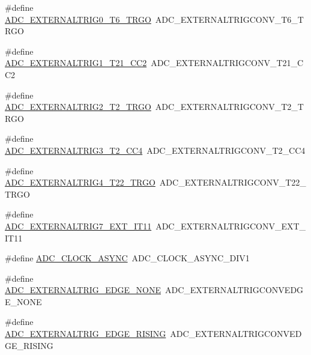 \begin{DoxyCompactItemize}
\item 
\#define \hyperlink{group___h_a_l___a_d_c___aliased___defines_ga72d7fcd1d65274786de2b3ccd6b853c4}{A\+D\+C\+\_\+\+E\+X\+T\+E\+R\+N\+A\+L\+T\+R\+I\+G0\+\_\+\+T6\+\_\+\+T\+R\+GO}~A\+D\+C\+\_\+\+E\+X\+T\+E\+R\+N\+A\+L\+T\+R\+I\+G\+C\+O\+N\+V\+\_\+\+T6\+\_\+\+T\+R\+GO
\item 
\#define \hyperlink{group___h_a_l___a_d_c___aliased___defines_gab001be8f7abe45ddf92a476a65c6dd50}{A\+D\+C\+\_\+\+E\+X\+T\+E\+R\+N\+A\+L\+T\+R\+I\+G1\+\_\+\+T21\+\_\+\+C\+C2}~A\+D\+C\+\_\+\+E\+X\+T\+E\+R\+N\+A\+L\+T\+R\+I\+G\+C\+O\+N\+V\+\_\+\+T21\+\_\+\+C\+C2
\item 
\#define \hyperlink{group___h_a_l___a_d_c___aliased___defines_gaad24eb6d74f2e4396d59afc4c715a053}{A\+D\+C\+\_\+\+E\+X\+T\+E\+R\+N\+A\+L\+T\+R\+I\+G2\+\_\+\+T2\+\_\+\+T\+R\+GO}~A\+D\+C\+\_\+\+E\+X\+T\+E\+R\+N\+A\+L\+T\+R\+I\+G\+C\+O\+N\+V\+\_\+\+T2\+\_\+\+T\+R\+GO
\item 
\#define \hyperlink{group___h_a_l___a_d_c___aliased___defines_gaa0f8054b3363d13a190ee0d366363575}{A\+D\+C\+\_\+\+E\+X\+T\+E\+R\+N\+A\+L\+T\+R\+I\+G3\+\_\+\+T2\+\_\+\+C\+C4}~A\+D\+C\+\_\+\+E\+X\+T\+E\+R\+N\+A\+L\+T\+R\+I\+G\+C\+O\+N\+V\+\_\+\+T2\+\_\+\+C\+C4
\item 
\#define \hyperlink{group___h_a_l___a_d_c___aliased___defines_ga671cb20b99d24f3c9923ac7777e5f84e}{A\+D\+C\+\_\+\+E\+X\+T\+E\+R\+N\+A\+L\+T\+R\+I\+G4\+\_\+\+T22\+\_\+\+T\+R\+GO}~A\+D\+C\+\_\+\+E\+X\+T\+E\+R\+N\+A\+L\+T\+R\+I\+G\+C\+O\+N\+V\+\_\+\+T22\+\_\+\+T\+R\+GO
\item 
\#define \hyperlink{group___h_a_l___a_d_c___aliased___defines_ga54407c5dc446f7d5425d8ac135bee69e}{A\+D\+C\+\_\+\+E\+X\+T\+E\+R\+N\+A\+L\+T\+R\+I\+G7\+\_\+\+E\+X\+T\+\_\+\+I\+T11}~A\+D\+C\+\_\+\+E\+X\+T\+E\+R\+N\+A\+L\+T\+R\+I\+G\+C\+O\+N\+V\+\_\+\+E\+X\+T\+\_\+\+I\+T11
\item 
\#define \hyperlink{group___h_a_l___a_d_c___aliased___defines_gae507056750621dbc26572874e89ef791}{A\+D\+C\+\_\+\+C\+L\+O\+C\+K\+\_\+\+A\+S\+Y\+NC}~A\+D\+C\+\_\+\+C\+L\+O\+C\+K\+\_\+\+A\+S\+Y\+N\+C\+\_\+\+D\+I\+V1
\item 
\#define \hyperlink{group___h_a_l___a_d_c___aliased___defines_ga324129b8c65e1f89b0002c31297935eb}{A\+D\+C\+\_\+\+E\+X\+T\+E\+R\+N\+A\+L\+T\+R\+I\+G\+\_\+\+E\+D\+G\+E\+\_\+\+N\+O\+NE}~A\+D\+C\+\_\+\+E\+X\+T\+E\+R\+N\+A\+L\+T\+R\+I\+G\+C\+O\+N\+V\+E\+D\+G\+E\+\_\+\+N\+O\+NE
\item 
\#define \hyperlink{group___h_a_l___a_d_c___aliased___defines_ga7955225cafbadae21be3c9eaaab4bd58}{A\+D\+C\+\_\+\+E\+X\+T\+E\+R\+N\+A\+L\+T\+R\+I\+G\+\_\+\+E\+D\+G\+E\+\_\+\+R\+I\+S\+I\+NG}~A\+D\+C\+\_\+\+E\+X\+T\+E\+R\+N\+A\+L\+T\+R\+I\+G\+C\+O\+N\+V\+E\+D\+G\+E\+\_\+\+R\+I\+S\+I\+NG

\end{DoxyCompactItemize}
